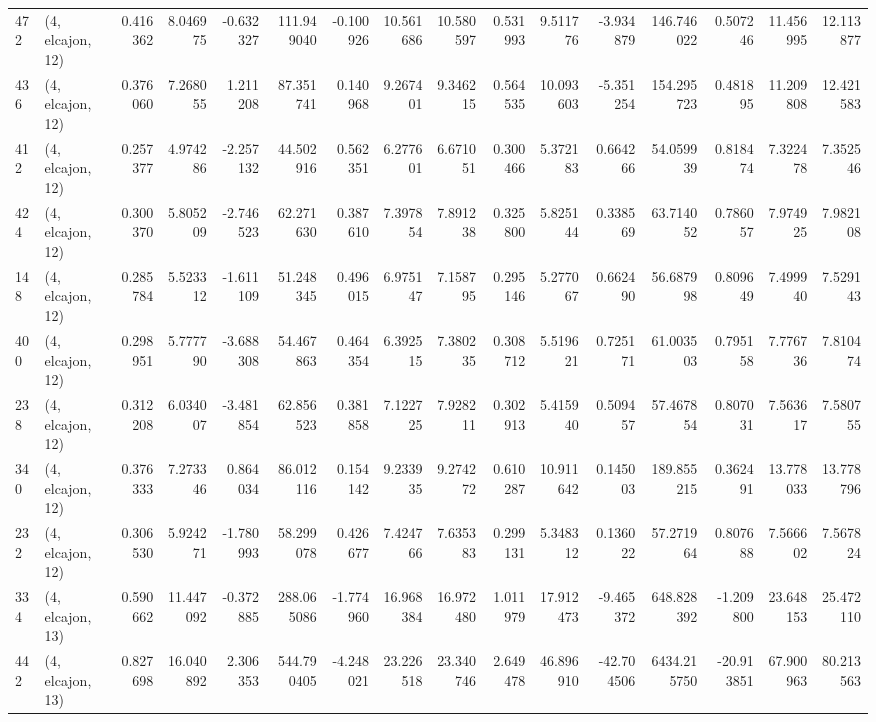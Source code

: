 \begin{tabular}{llrrrrrrrrrrrrrr}
472 &  (4, elcajon, 12) &   0.416362 &   8.046975 &  -0.632327 &   111.949040 &  -0.100926 &  10.561686 &  10.580597 &  0.531993 &   9.511776 &  -3.934879 &   146.746022 &   0.507246 &  11.456995 &  12.113877 \\
436 &  (4, elcajon, 12) &   0.376060 &   7.268055 &   1.211208 &    87.351741 &   0.140968 &   9.267401 &   9.346215 &  0.564535 &  10.093603 &  -5.351254 &   154.295723 &   0.481895 &  11.209808 &  12.421583 \\
412 &  (4, elcajon, 12) &   0.257377 &   4.974286 &  -2.257132 &    44.502916 &   0.562351 &   6.277601 &   6.671051 &  0.300466 &   5.372183 &   0.664266 &    54.059939 &   0.818474 &   7.322478 &   7.352546 \\
424 &  (4, elcajon, 12) &   0.300370 &   5.805209 &  -2.746523 &    62.271630 &   0.387610 &   7.397854 &   7.891238 &  0.325800 &   5.825144 &   0.338569 &    63.714052 &   0.786057 &   7.974925 &   7.982108 \\
148 &  (4, elcajon, 12) &   0.285784 &   5.523312 &  -1.611109 &    51.248345 &   0.496015 &   6.975147 &   7.158795 &  0.295146 &   5.277067 &   0.662490 &    56.687998 &   0.809649 &   7.499940 &   7.529143 \\
400 &  (4, elcajon, 12) &   0.298951 &   5.777790 &  -3.688308 &    54.467863 &   0.464354 &   6.392515 &   7.380235 &  0.308712 &   5.519621 &   0.725171 &    61.003503 &   0.795158 &   7.776736 &   7.810474 \\
238 &  (4, elcajon, 12) &   0.312208 &   6.034007 &  -3.481854 &    62.856523 &   0.381858 &   7.122725 &   7.928211 &  0.302913 &   5.415940 &   0.509457 &    57.467854 &   0.807031 &   7.563617 &   7.580755 \\
340 &  (4, elcajon, 12) &   0.376333 &   7.273346 &   0.864034 &    86.012116 &   0.154142 &   9.233935 &   9.274272 &  0.610287 &  10.911642 &   0.145003 &   189.855215 &   0.362491 &  13.778033 &  13.778796 \\
232 &  (4, elcajon, 12) &   0.306530 &   5.924271 &  -1.780993 &    58.299078 &   0.426677 &   7.424766 &   7.635383 &  0.299131 &   5.348312 &   0.136022 &    57.271964 &   0.807688 &   7.566602 &   7.567824 \\
334 &  (4, elcajon, 13) &   0.590662 &  11.447092 &  -0.372885 &   288.065086 &  -1.774960 &  16.968384 &  16.972480 &  1.011979 &  17.912473 &  -9.465372 &   648.828392 &  -1.209800 &  23.648153 &  25.472110 \\
442 &  (4, elcajon, 13) &   0.827698 &  16.040892 &   2.306353 &   544.790405 &  -4.248021 &  23.226518 &  23.340746 &  2.649478 &  46.896910 & -42.704506 &  6434.215750 & -20.913851 &  67.900963 &  80.213563 \\

\end{tabular}
